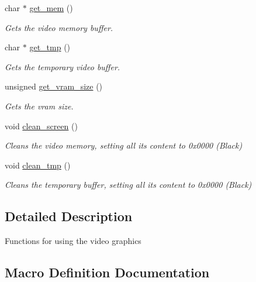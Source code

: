 \begin{DoxyCompactItemize}
char $\ast$ \mbox{\hyperlink{group__videog_ga753e43171fab6674507b8b8042be0906}{get\+\_\+mem}} ()
\begin{DoxyCompactList}\small\item\em Gets the video memory buffer. \end{DoxyCompactList}\item 
char $\ast$ \mbox{\hyperlink{group__videog_gae16576a0c83561a7c462fb76956e06dc}{get\+\_\+tmp}} ()
\begin{DoxyCompactList}\small\item\em Gets the temporary video buffer. \end{DoxyCompactList}\item 
unsigned \mbox{\hyperlink{group__videog_ga0a3c7d7f5ab9ad65df3f52a43354c5f7}{get\+\_\+vram\+\_\+size}} ()
\begin{DoxyCompactList}\small\item\em Gets the vram size. \end{DoxyCompactList}\item 
void \mbox{\hyperlink{group__videog_ga0d199b5702695c4d7b78ef83759c32d5}{clean\+\_\+screen}} ()
\begin{DoxyCompactList}\small\item\em Cleans the video memory, setting all its content to 0x0000 (Black) \end{DoxyCompactList}\item 
void \mbox{\hyperlink{group__videog_ga330b56594412c06fcf7c605709352a19}{clean\+\_\+tmp}} ()
\begin{DoxyCompactList}\small\item\em Cleans the temporary buffer, setting all its content to 0x0000 (Black) \end{DoxyCompactList}\end{DoxyCompactItemize}


\subsection{Detailed Description}
Functions for using the video graphics 

\subsection{Macro Definition Documentation}
\mbox{\label{group__videog_ga7b3b25cba33b07c303f3060fe41887f6}} 
